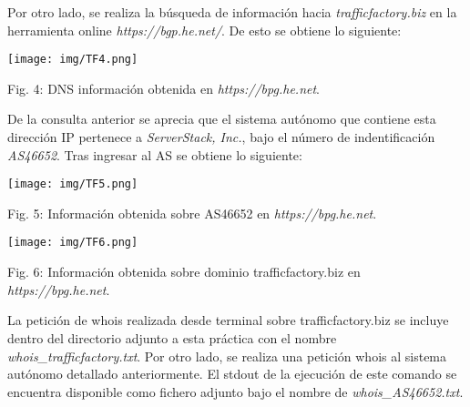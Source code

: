 \documentclass[12pt,oneside,a4paper]{book}
\begin{document}
\vspace{1em}

\hspace{20pt}
Por otro lado, se realiza la búsqueda de información hacia \textit{trafficfactory.biz} en la herramienta online \textit{https://bgp.he.net/}. De esto se obtiene lo siguiente:

\vspace{2em}

\begin{center}
	\texttt{[image: img/TF4.png]}
    
\vspace{0.1em}
    
    Fig. 4: DNS información obtenida en \textit{https://bpg.he.net}.
\end{center}

\vspace{2em}

\hspace{20pt}
De la consulta anterior se aprecia que el sistema autónomo que contiene esta dirección IP pertenece a \textit{ServerStack, Inc.}, bajo el número de indentificación \textit{AS46652}. Tras ingresar al AS se obtiene lo siguiente:

\vspace{2em}

\begin{center}
	\texttt{[image: img/TF5.png]}
    
\vspace{0.1em}
    
    Fig. 5: Información obtenida sobre AS46652 en \textit{https://bpg.he.net}.
\end{center}

\vspace{2em}

\begin{center}
	\texttt{[image: img/TF6.png]}
    
\vspace{0.1em}
    
    Fig. 6: Información obtenida sobre dominio trafficfactory.biz en \textit{https://bpg.he.net}.
\end{center}

\vspace{2em}

\hspace{20pt}
La petición de whois realizada desde terminal sobre trafficfactory.biz se incluye dentro del directorio adjunto a esta práctica con el nombre \textit{whois\_trafficfactory.txt}. Por otro lado, se realiza una petición whois al sistema autónomo detallado anteriormente. El stdout de la ejecución de este comando se encuentra disponible como fichero adjunto bajo el nombre de \textit{whois\_AS46652.txt}.
\end{document}
